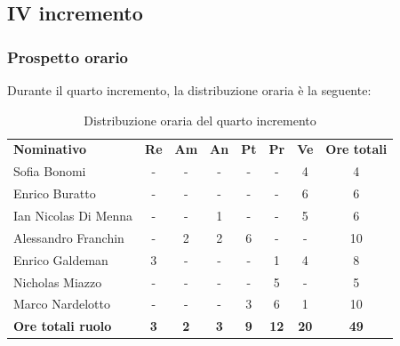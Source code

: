 \documentclass[../piano-di-progetto.tex]{subfiles}
\begin{document}
  \subsection{IV incremento}

  \subsubsection{Prospetto orario}
 Durante il quarto incremento, la distribuzione oraria è la seguente:
  \begin{table}[H]
    \centering
    \begin{tabular}{lccccccc}
    \rowcolor{lightgray}
    \textbf{Nominativo}       & \textbf{Re} & \textbf{Am} & \textbf{An} & \textbf{Pt} & \textbf{Pr} & \textbf{Ve} & \textbf{Ore totali} \\
Sofia Bonomi              & -           & -           & -           & -           & -           & 4           & 4                   \\
Enrico Buratto            & -           & -           & -           & -           & -           & 6           & 6                   \\
Ian Nicolas Di Menna      & -           & -           & 1           & -           & -           & 5           & 6                   \\
Alessandro Franchin       & -           & 2           & 2           & 6           & -           & -           & 10                  \\
Enrico Galdeman           & 3           & -           & -           & -           & 1           & 4           & 8                   \\
Nicholas Miazzo           & -           & -           & -           & -           & 5           & -           & 5                   \\
Marco Nardelotto          & -           & -           & -           & 3           & 6           & 1           & 10                  \\
\textbf{Ore totali ruolo} & \textbf{3}  & \textbf{2}  & \textbf{3}  & \textbf{9}  & \textbf{12} & \textbf{20} & \textbf{49}        
    
    \end{tabular}
    \caption{Distribuzione oraria del quarto incremento}
  \end{table}
\end{document}
